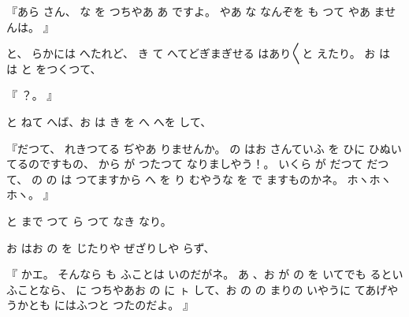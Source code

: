 『あら
さん、
な
を
つちやあ
あ
ですよ。
やあ
な
なんぞを
も
つて
やあ
ませんは。
』

と、
らかには
へたれど、
き
て
へてどぎまぎせる
はあり〳〵と
えたり。
お
は
は
と
をつくつて、

『
？。
』

と
ねて
へば、お
は
き
を
へ
へを
して、

『だつて、
れきつてる
ぢやあ
りませんか。
の
はお
さんていふ
を
ひに
ひぬいてるのですもの、
から
が
つたつて
なりましやう！。
いくら
が
だつて
だつて、
の
の
は
つてますから
へ
を
り
むやうな
を
で
ますものかネ。
ホヽホヽホヽ。
』

と
まで
つて
ら
つて
なき
なり。

お
はお
の
を
じたりや
ぜざりしや
らず、

『
かエ。
そんなら
も
ふことは
いのだがネ。
あ
、お
が
の
を
いてでも
るといふことなら、
に
つちやあお
の
に
ㇳ
して、お
の
の
まりの
いやうに
てあげやうかとも
にはふつと
つたのだよ。
』

